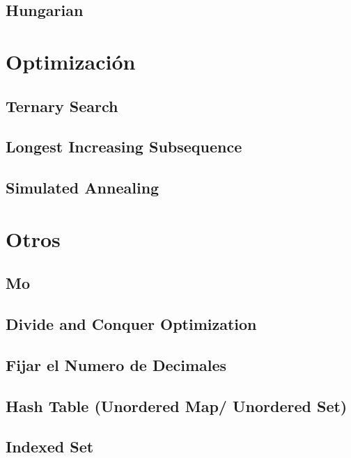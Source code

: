 \documentclass[a4paper,10pt,twocolumn]{article}
\begin{document}
\subsection{Hungarian}


\section{Optimización} %
\subsection{Ternary Search}

\subsection{Longest Increasing Subsequence}

\subsection{Simulated Annealing}


\section{Otros} %
\subsection{Mo}

\subsection{Divide and Conquer Optimization}

\subsection{Fijar el Numero de Decimales}

\subsection{Hash Table (Unordered Map/ Unordered Set)}

\subsection{Indexed Set}

\end{document}
